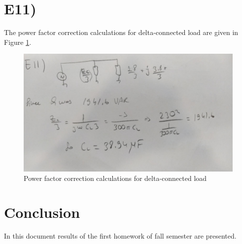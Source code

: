 \documentclass[letterpaper,12pt]{article}
\begin{document}
\section{E11)}
The power factor correction calculations for delta-connected load are given in Figure \ref*{E11}.


\begin{figure}[H]
    \centering
    \includegraphics[width = 1\textwidth]{E11.jpeg}
    \caption{Power factor correction calculations for delta-connected load}
    \label{E11}
\end{figure}


\section{Conclusion} In this document results of the first homework of fall semester are presented. 
\end{document}

